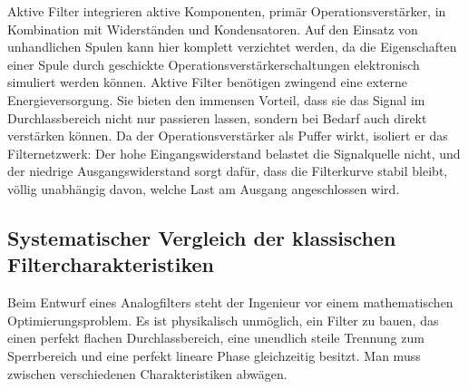 \documentclass[11pt,a4paper]{article}
\begin{document}
Aktive Filter integrieren aktive Komponenten, primär Operationsverstärker, in Kombination mit Widerständen und Kondensatoren. Auf den Einsatz von unhandlichen Spulen kann hier komplett verzichtet werden, da die Eigenschaften einer Spule durch geschickte Operationsverstärkerschaltungen elektronisch simuliert werden können. Aktive Filter benötigen zwingend eine externe Energieversorgung. Sie bieten den immensen Vorteil, dass sie das Signal im Durchlassbereich nicht nur passieren lassen, sondern bei Bedarf auch direkt verstärken können. Da der Operationsverstärker als Puffer wirkt, isoliert er das Filternetzwerk: Der hohe Eingangswiderstand belastet die Signalquelle nicht, und der niedrige Ausgangswiderstand sorgt dafür, dass die Filterkurve stabil bleibt, völlig unabhängig davon, welche Last am Ausgang angeschlossen wird.

\subsection{Systematischer Vergleich der klassischen Filtercharakteristiken}

Beim Entwurf eines Analogfilters steht der Ingenieur vor einem mathematischen Optimierungsproblem. Es ist physikalisch unmöglich, ein Filter zu bauen, das einen perfekt flachen Durchlassbereich, eine unendlich steile Trennung zum Sperrbereich und eine perfekt lineare Phase gleichzeitig besitzt. Man muss zwischen verschiedenen Charakteristiken abwägen.
\end{document}
